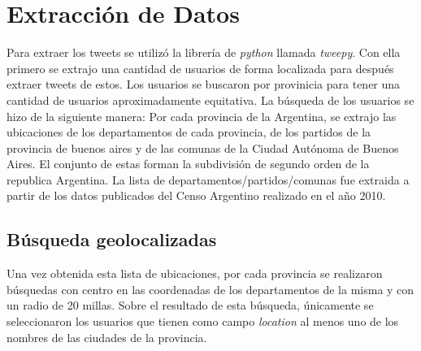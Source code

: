 
\section{Extracción de Datos}

Para extraer los tweets se utilizó la librería de \textit{python} llamada \textit{tweepy}. Con ella primero se extrajo una cantidad de usuarios de forma localizada para después extraer tweets de estos.
Los usuarios se buscaron por provinicia para tener una cantidad de usuarios aproximadamente equitativa.
La búsqueda de los usuarios se hizo de la siguiente manera:
Por cada provincia de la Argentina, se extrajo las ubicaciones de los departamentos de cada provincia, de los partidos de la provincia de buenos aires y de las comunas de la Ciudad Autónoma de Buenos Aires. El conjunto de estas forman la subdivisión de segundo orden de la republica Argentina. La lista de departamentos/partidos/comunas fue extraida a partir de los datos publicados del Censo Argentino realizado en el año 2010. 



\subsection{Búsqueda geolocalizadas}
Una vez obtenida esta lista de ubicaciones, por cada provincia se realizaron búsquedas con centro en las coordenadas de los departamentos de la misma y con un radio de 20 millas. Sobre el resultado de esta búsqueda, únicamente se seleccionaron los usuarios que tienen como campo \textit{location} al menos uno de los nombres de las ciudades de la provincia.

